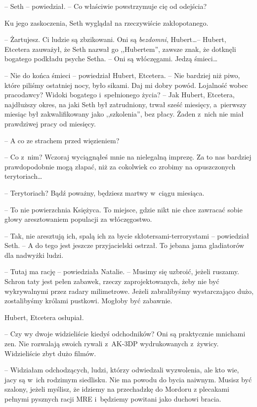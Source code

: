 \documentclass[oneside,polish,11pt,sfheadings]{mwbk}
\begin{document}
-- Seth -- powiedział. -- Co właściwie powstrzymuje cię od odejścia?

Ku jego zaskoczenia, Seth wyglądał na rzeczywiście zakłopotanego. 

-- Żartujesz. Ci ludzie są zbzikowani. Oni są \textit{bezdomni}, Hubert\ldots  -- Hubert, Etcetera zauważył, że Seth nazwał go ,,Hubertem'', zawsze znak,
że dotknęli bogatego podkładu psyche Setha. -- Oni są włóczęgami. Jedzą
śmieci\ldots 

-- Nie do końca śmieci -- powiedział Hubert, Etcetera. -- Nie bardziej niż
piwo, które piliśmy ostatniej nocy, było sikami. Daj mi dobry powód.
Lojalność wobec pracodawcy? Widoki bogatego i~spełnionego życia? -- Jak
Hubert, Etcetera, najdłuższy okres, na jaki Seth był zatrudniony, trwał
sześć miesięcy, a~pierwszy miesiąc był zakwalifikowany jako
,,szkolenia'', bez płacy. Żaden z~nich nie miał prawdziwej pracy od
miesięcy.

-- A co ze strachem przed więzieniem?

-- Co z~nim? Wczoraj wyciągnąłeś mnie na nielegalną imprezę. Za to nas
bardziej prawdopodobnie mogą złapać, niż za cokolwiek co zrobimy na
opuszczonych terytoriach\ldots 

-- Terytoriach? Bądź poważny, będziesz martwy w~ciągu miesiąca.

-- To nie powierzchnia Księżyca. To miejsce, gdzie nikt nie chce zawracać
sobie głowy aresztowaniem populacji za włóczęgostwo.

-- Tak, nie aresztują ich, spalą ich za bycie skłotersami-terrorystami -- powiedział Seth. -- A do tego jest jeszcze przyjacielski ostrzał. To
jebana jama gladiatorów dla nadwyżki ludzi.

-- Tutaj ma rację -- powiedziała Natalie. -- Musimy się uzbroić, jeżeli
ruszamy. Schron taty jest pełen zabawek, rzeczy zaprojektowanych, żeby
nie być wykrywalnymi przez radary milimetrowe. Jeżeli zabralibyśmy
wystarczająco dużo, zostalibyśmy królami pustkowi. Mogłoby być zabawnie.

Hubert, Etcetera osłupiał. 

-- Czy wy dwoje widzieliście kiedyś
odchodników? Oni są praktycznie mnichami zen. Nie rozwalają swoich
rywali z~AK-3DP wydrukowanych z~żywicy. Widzieliście zbyt dużo filmów.

-- Widziałam odchodzących, ludzi, którzy odwiedzali wyzwolenia, ale kto
wie, jacy są w~ich rodzimym siedlisku. Nie ma powodu do bycia naiwnym.
Musisz być szalony, jeżeli myślisz, że idziemy na przechadzkę do Mordoru
z plecakami pełnymi pysznych racji MRE i~będziemy powitani jako duchowi
bracia.
\end{document}
